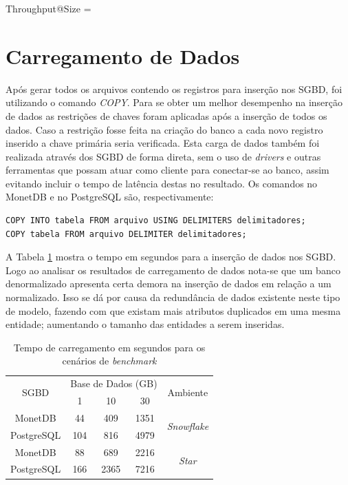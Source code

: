 \begin{myequation}%
\label{eq:2-2}
{\scriptstyle Throughput@Size} =  %
\end{myequation}
%

\section{Carregamento de Dados}

Após gerar todos os arquivos contendo os registros para inserção nos SGBD, foi utilizando o comando \textit{COPY}. Para se obter um melhor desempenho na inserção de dados as restrições de chaves foram aplicadas após a inserção de todos os dados. Caso a restrição fosse feita na criação do banco a cada novo registro inserido a chave primária seria verificada. Esta carga de dados também foi realizada através dos SGBD de forma direta, sem o uso de \textit{drivers} e outras ferramentas que possam atuar como cliente para conectar-se ao banco, assim evitando incluir o tempo de latência destas no resultado. Os comandos no MonetDB e no PostgreSQL são, respectivamente:

\begin{verbatim}
COPY INTO tabela FROM arquivo USING DELIMITERS delimitadores;
COPY tabela FROM arquivo DELIMITER delimitadores;
\end{verbatim}

A Tabela \ref{tab:carregamento} mostra o tempo em segundos para a inserção de dados nos SGBD. Logo ao analisar os resultados de carregamento de dados nota-se que um banco denormalizado apresenta certa demora na inserção de dados em relação a um normalizado. Isso se dá por causa da redundância de dados existente neste tipo de modelo, fazendo com que existam mais atributos duplicados em uma mesma entidade; aumentando o tamanho das entidades a serem inseridas. 

\begin{table}[htpb]
        \centering
        \caption{Tempo de carregamento em segundos para os cenários de \textit{benchmark}}
        \label{tab:carregamento}
        \begin{tabular}{c|ccc|c}
        \hline
        \multirow{2}{*}{SGBD} & \multicolumn{3}{c|}{Base de Dados (GB)} & \multirow{2}{*}{Ambiente}  \\
                              & 1           & 10          & 30          &                            \\ \hline
        MonetDB               & 44          & 409         & 1351        & \multirow{2}{*}{\textit{Snowflake}} \\
        PostgreSQL            & 104         & 816         & 4979        &                            \\ \hline
        MonetDB               & 88          & 689         & 2216        & \multirow{2}{*}{\textit{Star}}      \\
        PostgreSQL            & 166         & 2365        & 7216        &                            \\ \hline
        \end{tabular}
    \end{table}

